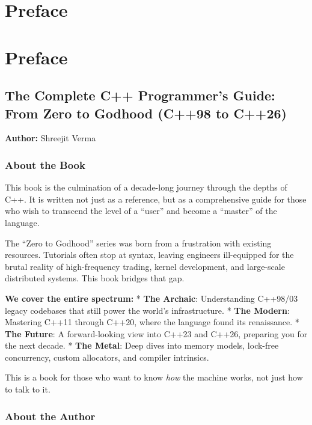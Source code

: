 \hypertarget{preface}{%
\section{Preface}\label{preface}}

\hypertarget{preface-1}{%
\section{Preface}\label{preface-1}}

\hypertarget{the-complete-c-programmers-guide-from-zero-to-godhood-c98-to-c26}{%
\subsection{The Complete C++ Programmer's Guide: From Zero to Godhood
(C++98 to
C++26)}\label{the-complete-c-programmers-guide-from-zero-to-godhood-c98-to-c26}}

\textbf{Author:} Shreejit Verma

\hypertarget{about-the-book}{%
\subsubsection{About the Book}\label{about-the-book}}

This book is the culmination of a decade-long journey through the depths
of C++. It is written not just as a reference, but as a comprehensive
guide for those who wish to transcend the level of a ``user'' and become
a ``master'' of the language.

The ``Zero to Godhood'' series was born from a frustration with existing
resources. Tutorials often stop at syntax, leaving engineers
ill-equipped for the brutal reality of high-frequency trading, kernel
development, and large-scale distributed systems. This book bridges that
gap.

\textbf{We cover the entire spectrum:} * \textbf{The Archaic}:
Understanding C++98/03 legacy codebases that still power the world's
infrastructure. * \textbf{The Modern}: Mastering C++11 through C++20,
where the language found its renaissance. * \textbf{The Future}: A
forward-looking view into C++23 and C++26, preparing you for the next
decade. * \textbf{The Metal}: Deep dives into memory models, lock-free
concurrency, custom allocators, and compiler intrinsics.

This is a book for those who want to know \emph{how} the machine works,
not just how to talk to it.

\hypertarget{about-the-author}{%
\subsubsection{About the Author}\label{about-the-author}}


